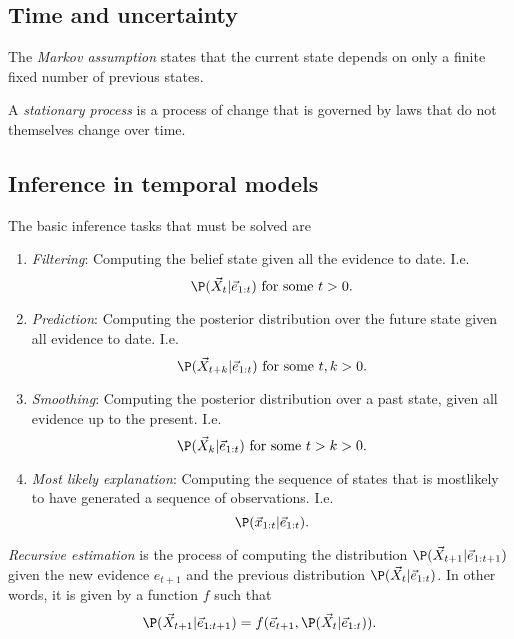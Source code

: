 \documentclass{article}
\begin{document}
\subsection{Time and uncertainty}

\begin{definition}
    The \emph{Markov assumption} states that the current
    state depends on only a finite fixed number of previous states.
\end{definition}

\begin{definition}
    A \emph{stationary process} is a process of change that is governed by laws
    that do not themselves change over time.
\end{definition}

\subsection{Inference in temporal models}

The basic inference tasks that must be solved are
\begin{enumerate}
    \item \emph{Filtering}: Computing the belief state given all the evidence to date.
    I.e. \[\P(\vec X_t | \vec e_{1:t}) \text{ for some } t>0.\]
    \item \emph{Prediction}: Computing the posterior distribution over the future
    state given all evidence to date. I.e. \[\P(\vec X_{t+k}|\vec e_{1:t})\text{ for some }t,k>0.\]
    \item \emph{Smoothing}: Computing the posterior distribution over a past state, given all evidence
    up to the present. I.e. \[\P(\vec X_k | \vec e_{1:t}) \text{ for some } t>k>0.\] 
    \item \emph{Most likely explanation}: Computing the sequence of states that is mostlikely to have
    generated a sequence of observations. I.e. \[\P(\vec x_{1:t}|\vec e_{1:t}).\]
\end{enumerate}

\begin{definition}
    \emph{Recursive estimation} is the process of computing the distribution $\P(\vec X_{t+1}|\vec e_{1:t+1})$
    given the new evidence $e_{t+1}$ and the previous distribution $\P(\vec X_t|\vec e_{1:t})$. In other words,
    it is given by a function $f$ such that
    \begin{align*}
        \P(\vec X_{t+1}|\vec e_{1:t+1})=f(\vec e_{t+1}, \P(\vec X_t|\vec e_{1:t})).
    \end{align*}
\end{definition}
\end{document}
